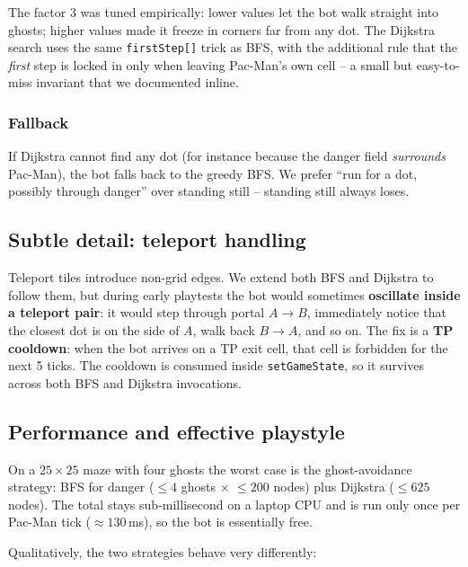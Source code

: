 \documentclass[11pt,a4paper]{article}
\begin{document}
The factor $3$ was tuned empirically: lower values let the bot walk
straight into ghosts; higher values made it freeze in corners far from
any dot. The Dijkstra search uses the same \texttt{firstStep[]} trick
as BFS, with the additional rule that the \emph{first} step is locked
in only when leaving Pac-Man's own cell -- a small but easy-to-miss
invariant that we documented inline.

\subsubsection{Fallback}

If Dijkstra cannot find any dot (for instance because the danger field
\emph{surrounds} Pac-Man), the bot falls back to the greedy BFS. We
prefer ``run for a dot, possibly through danger'' over standing still
-- standing still always loses.

\subsection{Subtle detail: teleport handling}

\begin{infobox}
Teleport tiles introduce non-grid edges. We extend both BFS and
Dijkstra to follow them, but during early playtests the bot would
sometimes \textbf{oscillate inside a teleport pair}: it would step
through portal $A\!\to\!B$, immediately notice that the closest dot is
on the side of $A$, walk back $B\!\to\!A$, and so on. The fix is a
\textbf{TP cooldown}: when the bot arrives on a TP exit cell, that cell
is forbidden for the next 5 ticks. The cooldown is consumed inside
\texttt{setGameState}, so it survives across both BFS and Dijkstra
invocations.
\end{infobox}

\subsection{Performance and effective playstyle}

On a $25\!\times\!25$ maze with four ghosts the worst case is the
ghost-avoidance strategy: BFS for danger ($\le 4$ ghosts $\times$
$\le 200$ nodes) plus Dijkstra ($\le 625$ nodes). The total stays
sub-millisecond on a laptop CPU and is run only once per Pac-Man tick
($\approx 130\,$ms), so the bot is essentially free.

Qualitatively, the two strategies behave very differently:
\end{document}
